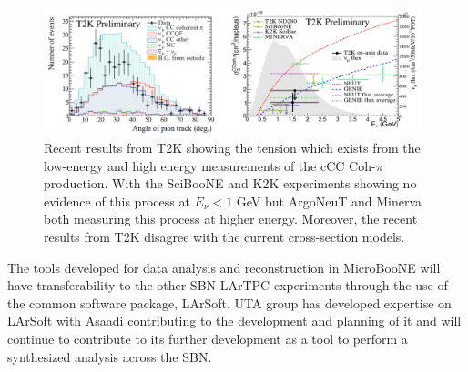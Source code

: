 \begin{figure}[htb]
\centering
\includegraphics[width=0.98\textwidth]{images/CCCohPion.png}
\caption[]{Recent results from T2K \cite{if:T2K} showing the tension which exists from the low-energy and high energy measurements of the cCC Coh-$\pi$ production. With the SciBooNE and K2K experiments showing no evidence of this process at $E_{\nu} < 1$ GeV but ArgoNeuT and Minerva both measuring this process at higher energy. Moreover, the recent results from T2K disagree with the current cross-section models.}
\label{fig:cccohpion}
\end{figure}


The tools developed for data analysis and reconstruction in MicroBooNE will have transferability to the other SBN LArTPC experiments through the use of the common software package, LArSoft. UTA group has developed expertise on LArSoft with Asaadi contributing to the development and planning of it and will continue to contribute to its further development as a tool to perform a synthesized analysis across the SBN.
